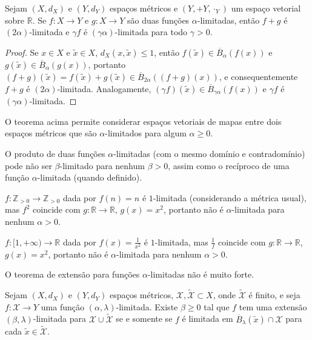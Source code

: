 \begin{theorem}
  Sejam $(X, d_X)$ e $(Y, d_Y)$ espaços métricos e $(Y, +Y, \cdot_Y)$ um espaço vetorial sobre $\mathbb{R}$. Se $f \colon X \to Y$ e $g \colon X \to Y$ são duas funções $\alpha$-limitadas, então $f + g$ é $(2\alpha)$-limitada e $\gamma f$ é $(\gamma \alpha)$-limitada para todo $\gamma > 0$.
\end{theorem}
\begin{proof}
  Se $x \in X$ e $\tilde{x} \in X$, $d_X(x, \tilde{x}) \le 1$, então $f(\tilde{x}) \in \overline{B}_{\alpha}(f(x))$ e $g(\tilde{x}) \in \overline{B}_{\alpha}(g(x))$, portanto $(f + g)(\tilde{x}) = f(\tilde{x}) + g(\tilde{x}) \in \overline{B}_{2\alpha}((f + g)(x))$, e consequentemente $f + g$ é $(2\alpha)$-limitada. Analogamente, $(\gamma f)(\tilde{x}) \in \overline{B}_{\gamma \alpha}(f(x))$ e $\gamma f$ é $(\gamma \alpha)$-limitada.
\end{proof}

O teorema acima permite considerar espaços vetoriais de mapas entre dois espaços métricos que são $\alpha$-limitados para algum $\alpha \ge 0$.

O produto de duas funções $\alpha$-limitadas (com o mesmo domínio e contradomínio) pode não ser $\beta$-limitado para nenhum $\beta > 0$, assim como o recíproco de uma função $\alpha$-limitada (quando definido).

\begin{example}
  $f \colon \mathbb{Z}_{> 0} \to \mathbb{Z}_{> 0}$ dada por $f(n) = n$ é $1$-limitada (considerando a métrica usual), mas $f^2$ coincide com $g \colon \mathbb{R} \to \mathbb{R}$, $g(x) = x^2$, portanto não é $\alpha$-limitada para nenhum $\alpha > 0$.
\end{example}

\begin{example}
  $f \colon [1, +\infty) \to \mathbb{R}$ dada por $f(x) = \frac{1}{x^2}$ é $1$-limitada, mas $\frac{1}{f}$ coincide com $g \colon \mathbb{R} \to \mathbb{R}$, $g(x) = x^2$, portanto não é $\alpha$-limitada para nenhum $\alpha > 0$.
\end{example}

O teorema de extensão para funções $\alpha$-limitadas não é muito forte.

\begin{theorem} \label{tietze}
  Sejam $(X,d_X)$ e $(Y, d_Y)$ espaços métricos, $\mathcal{X}, \tilde{\mathcal{X}} \subset X$, onde $\tilde{\mathcal{X}}$ é finito, e seja $f \colon \mathcal{X} \to Y$ uma função $(\alpha,\lambda)$-limitada. Existe $\beta \ge 0$ tal que $f$ tem uma extensão $(\beta,\lambda)$-limitada para $\mathcal{X} \cup \tilde{\mathcal{X}}$ se e somente se $f$ é limitada em $\overline{B}_{\lambda}(\tilde{x}) \cap \mathcal{X}$ para cada $\tilde{x} \in \tilde{\mathcal{X}}$.
\end{theorem}


